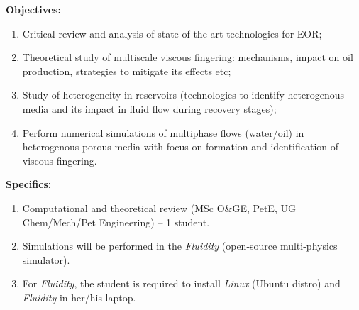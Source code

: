 \documentclass[12pts,a4paper,amsmath,amssymb,floatfix]{article}%
\newcommand{\all}{MSc O$\&$GE, PetE, UG Chem/Mech/Pet Engineering}
\begin{document}
\begin{enumerate}[label=\bfseries Project: \arabic*:]
\noindent
{\bf Objectives:}
\begin{enumerate}
\item Critical review and analysis of state-of-the-art technologies for EOR;
\item Theoretical study of multiscale viscous fingering: mechanisms, impact on oil production, strategies to mitigate its effects etc;
\item Study of heterogeneity in reservoirs (technologies to identify heterogenous media and its impact in fluid flow during recovery stages);
\item Perform numerical simulations of multiphase flows (water/oil) in heterogenous porous media with focus on formation and identification of viscous fingering.  
\end{enumerate}

\noindent
{\bf Specifics:} 
\begin{enumerate}
\item Computational and theoretical review (\all) -- 1 student. 
\item Simulations will be performed in the {\it Fluidity} (open-source multi-physics simulator). 
\item For {\it Fluidity}, the student is required to install {\it Linux} (Ubuntu distro) and {\it Fluidity} in her/his laptop. 
\end{enumerate}



\end{enumerate}
\end{document}
